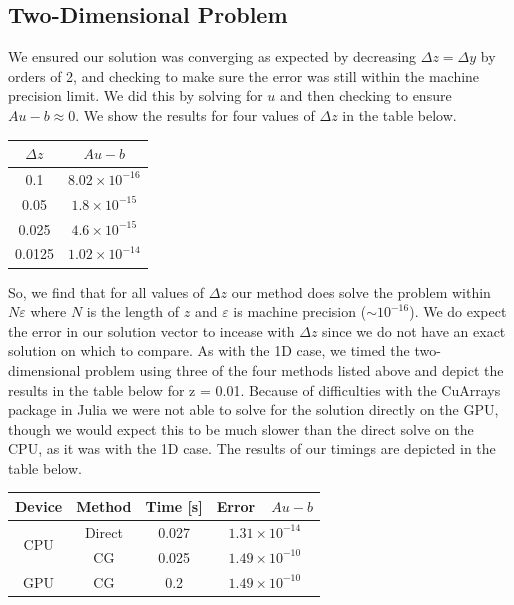 \documentclass[11pt]{article}
\begin{document}
	\subsection{Two-Dimensional Problem}
	We ensured our solution was converging as expected by decreasing $ \Delta z = \Delta y $ by orders of 2, and checking to make sure the error was still within the machine precision limit. We did this by solving for $ u $ and then checking to ensure $ Au - b \approx 0 $. We show the results for four values of $ \Delta z $ in the table below.
		\begin{center}
		\renewcommand{\arraystretch}{2.0}
		\begin{tabular}{c|c}
			\hline\hline
			$\displaystyle \Delta z $&$\displaystyle Au-b $\\
			\hline
			0.1&$8.02\times 10^{-16}$\\
			0.05&$1.8\times 10^{-15}$\\
			0.025&$4.6\times 10^{-15}$\\
			0.0125&$1.02\times 10^{-14}$\\
			\hline
		\end{tabular}
	\end{center}
	So, we find that for all values of $ \Delta z $ our method does solve the problem within $ N\varepsilon $ where $ N $ is the length of $ z $ and $ \varepsilon $ is machine precision ($ \sim 10^{-16} $). We do expect the error in our solution vector to incease with $ \Delta z $ since we do not have an exact solution on which to compare.
	\newline\indent
	As with the 1D case, we timed the two-dimensional problem using three of the four methods listed above and depict the results in the table below for \Delta z = 0.01. Because of difficulties with the CuArrays package in Julia we were not able to solve for the solution directly on the GPU, though we would expect this to be much slower than the direct solve on the CPU, as it was with the 1D case. The results of our timings are depicted in the table below.
	\begin{center}
		\renewcommand{\arraystretch}{1.5}
		\begin{tabular}{c|c|c|c}
			\hline\hline
			\textbf{Device}&\textbf{Method}&\textbf{Time [s]}&\textbf{Error~~$Au-b $}\\
			\hline
			\multirow{2}{*}{CPU}&Direct&0.027&$1.31\times 10^{-14}$\\
			&CG&0.025&$1.49\times 10^{-10}$\\
			\hline
			GPU&CG&0.2&$1.49\times 10^{-10}$\\
			\hline
		\end{tabular}
	\end{center}
\end{document}
